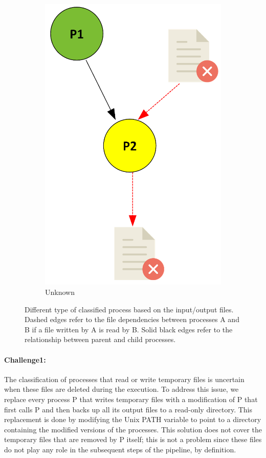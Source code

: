 \documentclass{article}
\begin{document}
{\begin{figure}[H]
\begin{subfigure}{0.15\textwidth}
    \includegraphics[scale=0.35]{images/yellow.png}
    \caption{Unknown}
    \label{fig:yellow}
\end{subfigure}
    \caption{Different type of classified process based on the input/output files.
  Dashed edges refer to the file dependencies between processes A and B 
  if a file written by A is read by B. Solid black edges refer to the 
  relationship between parent and child processes.}
    \label{fig:processes}
\end{figure}

\paragraph{Challenge1:} The classification of processes that read or 
write temporary files is uncertain when these files are deleted during 
the execution. To address this issue, we replace every process P that 
writes temporary files with a modification of P that first calls P and 
then backs up all its output files to a read-only directory. This 
replacement is done by modifying the Unix PATH variable to point to a 
directory containing the modified versions of the processes. This 
solution does not cover the temporary files that are removed by P 
itself; this is not a problem since these files do not play any role in 
the subsequent steps of the pipeline, by definition.

}
\end{document}

